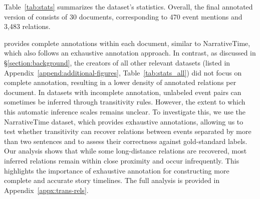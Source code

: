 Table~\ref{tab:stats} summarizes the \App{} dataset's statistics. Overall, the final annotated version of \App{} consists of 30 documents, corresponding to 470 event mentions and 3,483 relations.



\App{} provides complete annotations within each document, similar to NarrativeTime, which also follows an exhaustive annotation approach. In contrast, as discussed in §\ref{section:background}, the creators of all other relevant datasets (listed in Appendix~\ref{append:additional-figures}, Table~\ref{tab:stats_all}) did not focus on complete annotation, resulting in a lower density of annotated relations per document.
In datasets with incomplete annotation, unlabeled event pairs can sometimes be inferred through transitivity rules. However, the extent to which this automatic inference scales remains unclear. To investigate this, we use the NarrativeTime dataset, which provides exhaustive annotations, allowing us to test whether transitivity can recover relations between events separated by more than two sentences and to assess their correctness against gold-standard labels. Our analysis shows that while some long-distance relations are recovered, most inferred relations remain within close proximity and occur infrequently. This highlights the importance of exhaustive annotation for constructing more complete and accurate story timelines. The full analysis is provided in Appendix~\ref{appx:trans-rels}.


